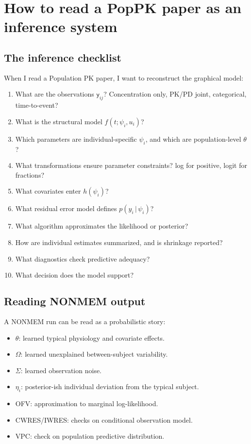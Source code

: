 \documentclass[a4paper]{article}
\newcommand{\rv}[1]{\mathsf{#1}}
\newcommand{\given}{\,|\,}
\begin{document}
\section{How to read a PopPK paper as an inference system}

\subsection{The inference checklist}

When I read a Population PK paper, I want to reconstruct the graphical model:

\begin{enumerate}[leftmargin=2em]
  \item What are the observations \(\rv{y}_{ij}\)? Concentration only, PK/PD joint, categorical, time-to-event?
  \item What is the structural model \(f(t;\psi_i,u_i)\)?
  \item Which parameters are individual-specific \(\psi_i\), and which are population-level \(\theta\)?
  \item What transformations ensure parameter constraints? log for positive, logit for fractions?
  \item What covariates enter \(h(\psi_i)\)?
  \item What residual error model defines \(p(y_i\given\psi_i)\)?
  \item What algorithm approximates the likelihood or posterior?
  \item How are individual estimates summarized, and is shrinkage reported?
  \item What diagnostics check predictive adequacy?
  \item What decision does the model support?
\end{enumerate}

\subsection{Reading NONMEM output}

A NONMEM run can be read as a probabilistic story:

\begin{itemize}[leftmargin=2em]
  \item \(\theta\): learned typical physiology and covariate effects.
  \item \(\Omega\): learned unexplained between-subject variability.
  \item \(\Sigma\): learned observation noise.
  \item \(\eta_i\): posterior-ish individual deviation from the typical subject.
  \item OFV: approximation to marginal log-likelihood.
  \item CWRES/IWRES: checks on conditional observation model.
  \item VPC: check on population predictive distribution.
\end{itemize}
\end{document}
